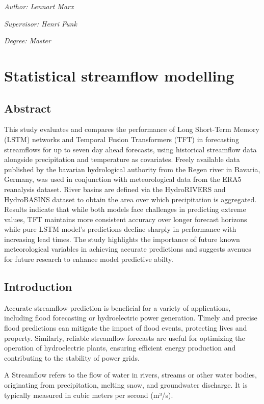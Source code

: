 \documentclass[
]{article}
\author{}
\date{\vspace{-2.5em}}
\begin{document}
\emph{Author: Lennart Marx}

\emph{Supervisor: Henri Funk}

\emph{Degree: Master}

\hypertarget{sm}{%
\section{Statistical streamflow modelling}\label{sm}}

\hypertarget{abstract}{%
\subsection{Abstract}\label{abstract}}

This study evaluates and compares the performance of Long Short-Term
Memory (LSTM) networks and Temporal Fusion Transformers (TFT) in
forecasting streamflows for up to seven day ahead forecasts, using
historical streamflow data alongside precipitation and temperature as
covariates. Freely available data published by the bavarian hydrological
authority from the Regen river in Bavaria, Germany, was used in
conjunction with meteorological data from the ERA5 reanalysis dataset.
River basins are defined via the HydroRIVERS and HydroBASINS dataset to
obtain the area over which precipitation is aggregated. Results indicate
that while both models face challenges in predicting extreme values, TFT
maintains more consistent accuracy over longer forecast horizons while
pure LSTM model's predictions decline sharply in performance with
increasing lead times. The study highlights the importance of future
known meteorological variables in achieving accurate predictions and
suggests avenues for future research to enhance model predictive abilty.

\hypertarget{introduction}{%
\subsection{Introduction}\label{introduction}}

Accurate streamflow prediction is beneficial for a variety of
applications, including flood forecasting or hydroelectric power
generation. Timely and precise flood predictions can mitigate the impact
of flood events, protecting lives and property. Similarly, reliable
streamflow forecasts are useful for optimizing the operation of
hydroelectric plants, ensuring efficient energy production and
contributing to the stability of power grids.

A Streamflow refers to the flow of water in rivers, streams or other
water bodies, originating from precipitation, melting snow, and
groundwater discharge. It is typically measured in cubic meters per
second (m³/s).
\end{document}
